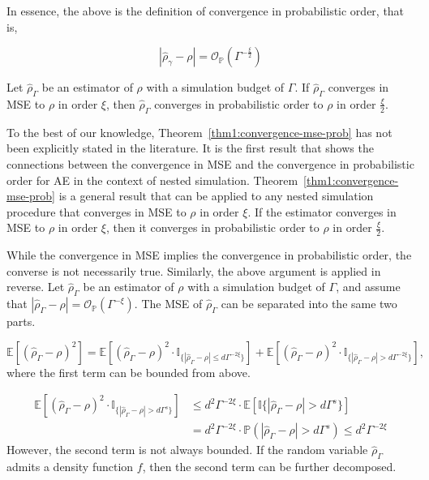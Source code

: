 In essence, the above is the definition of convergence in probabilistic order, that is,

$$
    \left| \hat{\rho}_{\gamma} - \rho \right| = \mathcal{O}_\mathbb{P} \left( \Gamma^{-\frac{\xi}{2}} \right)
$$

\begin{theorem} \label{thm1:convergence-mse-prob}
    Let $\hat{\rho}_{\Gamma}$ be an estimator of $\rho$ with a simulation budget of $\Gamma$. 
    If $\hat{\rho}_{\Gamma}$ converges in MSE to $\rho$ in order $\xi$, then $\hat{\rho}_{\Gamma}$ converges in probabilistic order to $\rho$ in order $\frac{\xi}{2}$.
\end{theorem}

To the best of our knowledge, Theorem~\ref{thm1:convergence-mse-prob} has not been explicitly stated in the literature.
It is the first result that shows the connections between the convergence in MSE and the convergence in probabilistic order for AE in the context of nested simulation.
Theorem~\ref{thm1:convergence-mse-prob} is a general result that can be applied to any nested simulation procedure that converges in MSE to $\rho$ in order $\xi$.
If the estimator converges in MSE to $\rho$ in order $\xi$, then it converges in probabilistic order to $\rho$ in order $\frac{\xi}{2}$.

While the convergence in MSE implies the convergence in probabilistic order, the converse is not necessarily true.
Similarly, the above argument is applied in reverse.
Let $\hat{\rho}_{\Gamma}$ be an estimator of $\rho$ with a simulation budget of $\Gamma$, and assume that $|\hat{\rho}_{\Gamma} - \rho| = \mathcal{O}_{\mathbb{P}}(\Gamma^{-\xi})$.
The MSE of $\hat{\rho}_{\Gamma}$ can be separated into the same two parts.

$$
    \mathbb{E}\left[ \left(\hat{\rho}_{\Gamma} - \rho\right)^2 \right] = \mathbb{E} \left[ \left(\hat{\rho}_{\Gamma} - \rho\right)^2 \cdot \mathbb{I}_{\{|\hat{\rho}_{\Gamma} - \rho| \leq d\Gamma^{-2\xi}\}} \right] + \mathbb{E} \left[ \left(\hat{\rho}_{\Gamma} - \rho\right)^2 \cdot \mathbb{I}_{\{|\hat{\rho}_{\Gamma} - \rho| > d\Gamma^{-2\xi}\}} \right], 
$$
where the first term can be bounded from above.

\begin{align*}
    \mathbb{E} \left[ \left(\hat{\rho}_{\Gamma} - \rho\right)^2 \cdot \mathbb{I}_{\{|\hat{\rho}_{\Gamma} - \rho| > d\Gamma^s\}} \right] 
    & \leq d^2 \Gamma^{-2\xi} \cdot \mathbb{E} \left[ \mathbb{I}\{|\hat{\rho}_{\Gamma} - \rho| > d\Gamma^s \} \right] \\
    & = d^2 \Gamma^{-2\xi} \cdot \mathbb{P} \left(|\hat{\rho}_{\Gamma} - \rho| > d\Gamma^s \right) \leq d^2 \Gamma^{-2\xi} 
\end{align*}
However, the second term is not always bounded. 
If the random variable $\hat{\rho}_{\Gamma}$ admits a density function $f$, then the second term can be further decomposed.

